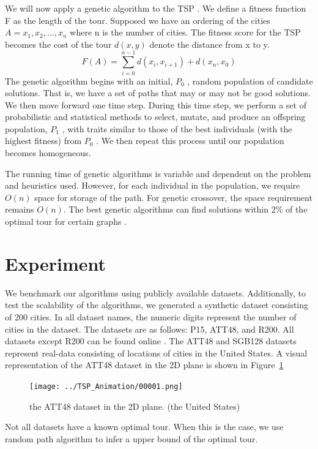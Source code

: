 \documentclass[10pt,twocolumn,letterpaper]{article}
\begin{document}
We will now apply a genetic algorithm to the TSP \cite{bryant2000genetic}. We define a fitness function F as the
length of the tour. Supposed we have an ordering of the
cities $A = {x_1 , x_2 , ..., x_n }$ where n is the number of cities.
The fitness score for the TSP becomes the cost of the tour
$d(x, y)$ denote the distance from x to y.
\begin{equation}
	F(A) =\sum_{i=0}^{n-1} d(x_i , x_{i+1}) + d(x_n , x_0 )
\end{equation}
The genetic algorithm begins with an initial, $P_0$ , random
population of candidate solutions. That is, we have a set of
paths that may or may not be good solutions. We then move
forward one time step. During this time step, we perform a
set of probabilistic and statistical methods to select, mutate,
and produce an offspring population, $P_1$ , with traits similar
to those of the best individuals (with the highest fitness)
from $P_0$ . We then repeat this process until our population becomes homogeneous.

The running time of genetic algorithms is variable and dependent on the problem and heuristics used. However, for
each individual in the population, we require $O(n)$ space for
storage of the path. For genetic crossover, the space requirement remains $O(n)$. The best genetic algorithms can find solutions within 2\% of the optimal tour for certain graphs \cite{homaifar1992schema}.

\section{Experiment}\label{sec:exp}
We benchmark our algorithms using publicly available
datasets. 
Additionally, to test the scalability of the algorithms, we generated a synthetic dataset consisting of 200 cities. 
In all dataset names, the numeric digits represent
the number of cities in the dataset. 
The datasets are as follows: P15, ATT48, and R200.
All datasets except R200 can be found online \cite{data0,data1}. The
ATT48 and SGB128 datasets represent real-data consisting
of locations of cities in the United States. 
A visual representation of the ATT48 dataset in the 2D plane is shown
in Figure~\ref{fig:00001}
\begin{figure}
\centering
\texttt{[image: ../TSP\_Animation/00001.png]}
\caption{the ATT48 dataset in the 2D plane. (the United States)}
\label{fig:00001}
\end{figure}

Not all datasets have a known optimal tour. When this is the case, we use random path algorithm to infer a upper bound of the optimal tour. 
\end{document}
